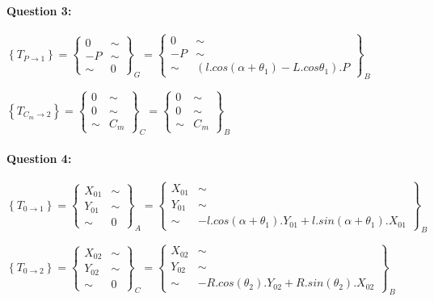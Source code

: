 \paragraph{Question 3:}

$\left\{T_{P\rightarrow 1}\right\}=\left\{\begin{array}{cc}
0 & \sim \\
-P & \sim \\
\sim & 0
\end{array}\right\}_G=
\left\{\begin{array}{cc}
0 & \sim \\
-P & \sim \\
\sim & (l.cos(\alpha+\theta_1)-L.cos\theta_1).P
\end{array}\right\}_B$

$\left\{T_{C_m\rightarrow 2}\right\}=\left\{\begin{array}{cc}
0 & \sim \\
0 & \sim \\
\sim & C_m
\end{array}\right\}_C=
\left\{\begin{array}{cc}
0 & \sim \\
0 & \sim \\
\sim & C_m
\end{array}\right\}_B$

\paragraph{Question 4:}

$\left\{T_{0\rightarrow 1}\right\}=\left\{\begin{array}{cc}
X_{01} & \sim \\
Y_{01} & \sim \\
\sim & 0
\end{array}\right\}_A=
\left\{\begin{array}{cc}
X_{01} & \sim \\
Y_{01} & \sim \\
\sim & -l.cos(\alpha+\theta_1).Y_{01}+l.sin(\alpha+\theta_1).X_{01}
\end{array}\right\}_B$

$\left\{T_{0\rightarrow 2}\right\}=\left\{\begin{array}{cc}
X_{02} & \sim \\
Y_{02} & \sim \\
\sim & 0
\end{array}\right\}_C=
\left\{\begin{array}{cc}
X_{02} & \sim \\
Y_{02} & \sim \\
\sim & -R.cos(\theta_2).Y_{02}+R.sin(\theta_2).X_{02}
\end{array}\right\}_B$


